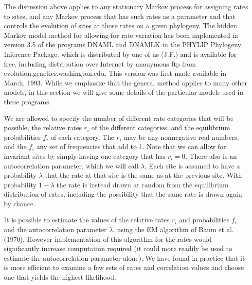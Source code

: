\documentclass[12pt]{article}
\begin{document}
The discussion above applies to any stationary Markov process for assigning
rates to sites, and any Markov process that has such rates as a parameter and
that controls the evolution of sites at those rates on a given phylogeny.  The
hidden Markov model method for allowing for rate variation has been implemented
in version 3.5 of the programs DNAML and DNAMLK in the PHYLIP Phylogeny
Inference Package, which is distributed by one of us (J.F.) and is available
for free, including distribution over Internet by anonymous ftp from
evolution.genetics.washington.edu.  This version was first
made available in March, 1993.  While we emphasize
that the general method applies to many other models, in this section we will
give some details of the particular models used in these programs.

We are allowed to specify the number of different rate categories that
will be possible, the relative rates $r_i$ of the different categories, and
the equilibrium probabilities $f_i$ of each category.  The $r_i$ may be any
nonnegative real numbers, and the $f_i$ any set of frequencies that add to
1.  Note that we can allow for invariant sites by simply having one category
that has $r_i = 0$.  There also is an autocorrelation parameter,
which we will call $\lambda$.
Each site is assumed to have a probability $\lambda$ that the rate at that
site is the same as at the previous site.  With probability $1-\lambda$ the
rate is instead drawn at random from the equilibrium distribution of rates,
including the possibility that the same rate is drawn again by chance.

It is possible to estimate the values of the relative rates $r_i$ and probabilities $f_i$
and the autocorrelation parameter $\lambda$, using the EM algorithm
of Baum et al. (1970).
However implementation of this algorithm for the rates would significantly
increase computation required (it could more readily be used to
estimate the autocorrelation parameter alone). 
We have found in practice that it is more efficient
to examine a few sets of rates and correlation values
and choose one that yields the highest likelihood.
\end{document}
